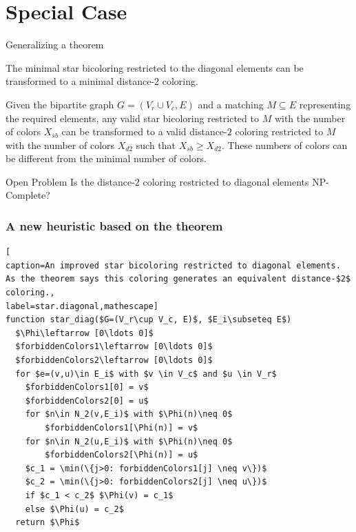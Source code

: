 \documentclass{beamer}
\begin{document}
\section{Special Case}
\begin{frame}{Generalizing a theorem}
\begin{theorem}
The minimal star bicoloring restricted to the diagonal elements
can be transformed to a minimal distance-$2$ coloring.
\end{theorem}
\pause\begin{theorem}
Given the bipartite graph $G=(V_r\cup V_c,E)$ and a matching $M\subseteq E$ representing
the required elements, any valid star bicoloring restricted to $M$
with the number of colors $X_{sb}$
can be transformed to a valid distance-$2$ coloring restricted to $M$
with the number of colors $X_{d2}$ such that $X_{sb} \geq X_{d2}$.
These numbers of colors can be different from the minimal number of colors.
\end{theorem}
\pause\begin{alertblock}{Open Problem}
Is the distance-$2$ coloring restricted to diagonal elements NP-Complete?
\end{alertblock}
\end{frame}

\begin{frame}[fragile]
\frametitle{A new heuristic based on the theorem}
\begin{lstlisting}[
caption=An improved star bicoloring restricted to diagonal elements.
As the theorem says this coloring generates an equivalent distance-$2$ coloring.,
label=star.diagonal,mathescape]
function star_diag($G=(V_r\cup V_c, E)$, $E_i\subseteq E$)
  $\Phi\leftarrow [0\ldots 0]$
  $forbiddenColors1\leftarrow [0\ldots 0]$
  $forbiddenColors2\leftarrow [0\ldots 0]$
  for $e=(v,u)\in E_i$ with $v \in V_c$ and $u \in V_r$
    $forbiddenColors1[0] = v$
    $forbiddenColors2[0] = u$
    for $n\in N_2(v,E_i)$ with $\Phi(n)\neq 0$
        $forbiddenColors1[\Phi(n)] = v$
    for $n\in N_2(u,E_i)$ with $\Phi(n)\neq 0$
        $forbiddenColors2[\Phi(n)] = u$
    $c_1 = \min(\{j>0: forbiddenColors1[j] \neq v\})$
    $c_2 = \min(\{j>0: forbiddenColors2[j] \neq u\})$
    if $c_1 < c_2$ $\Phi(v) = c_1$
    else $\Phi(u) = c_2$
  return $\Phi$
\end{lstlisting}
\end{frame}
\end{document}
